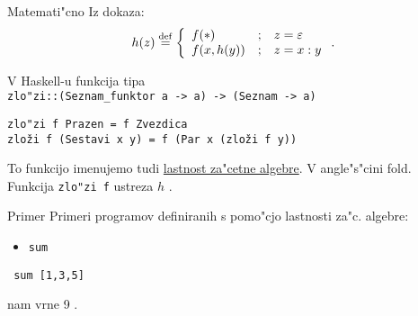 \documentclass[t,usenames,dvipsnames]{beamer} %
\begin{document}
\begin{frame}
	\begin{block}{Matemati"cno}
		Iz dokaza:
		$$ \mathnormal{h}(z) \stackrel{\mathrm{def}}{=} \left\{ \begin{array}{lll}
		f(*) & ; & z = \varepsilon \\
		f(x,h(y)) & ; & z = x:y
		\end{array} \right. . $$	
	\end{block}
	
	V Haskell-u funkcija tipa \\
	\texttt{zlo"zi::(Seznam\_funktor a -> a) -> (Seznam -> a)} \\	
	\begin{beamerboxesrounded}[lower=loweryel,shadow=false]{}
		\texttt{zlo"zi f Prazen = f Zvezdica} \\
		\texttt{zloži f (Sestavi x y) = f (Par x (zloži f y))}
	\end{beamerboxesrounded}
	
To funkcijo imenujemo tudi \underline{lastnost za"cetne algebre}. 
V angle"s"cini fold.\\

Funkcija \texttt{zlo"zi f} ustreza $h$ .

\end{frame}


\begin{frame}{Primer}
	Primeri programov definiranih s pomo"cjo lastnosti za"c. algebre:
	\begin{itemize}
		\item \texttt{sum}
	\end{itemize}
	
\begin{beamerboxesrounded}[lower=loweryel,shadow=false]{}
	\texttt{ sum [1,3,5] } 
\end{beamerboxesrounded}
	nam vrne 9 .
	
\end{frame}
\end{document}
